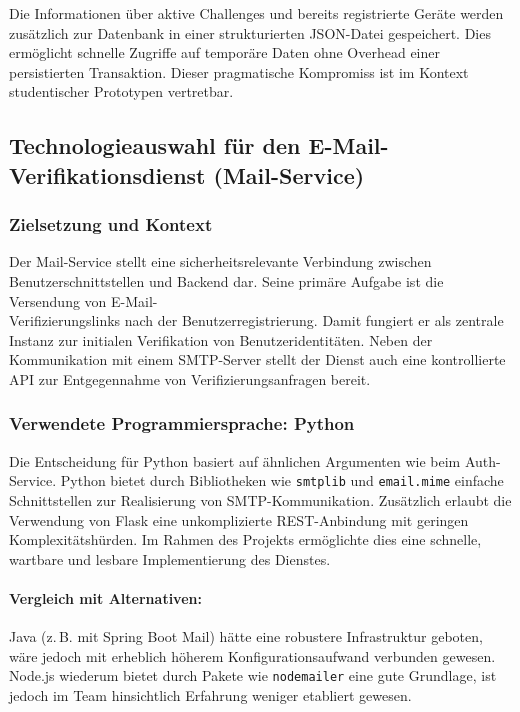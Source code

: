 Die Informationen \"uber aktive Challenges und bereits registrierte Ger\"ate werden zus\"atzlich zur Datenbank in einer strukturierten JSON-Datei gespeichert. Dies erm\"oglicht schnelle Zugriffe auf tempor\"are Daten ohne Overhead einer persistierten Transaktion. Dieser pragmatische Kompromiss ist im Kontext studentischer Prototypen vertretbar.

\subsection{Technologieauswahl f\"ur den E-Mail-Verifikationsdienst (Mail-Service)}

\subsubsection*{Zielsetzung und Kontext}

Der Mail-Service stellt eine sicherheitsrelevante Verbindung zwischen Benutzerschnittstellen und Backend dar. Seine prim\"are Aufgabe ist die Versendung von E-Mail-\\Verifizierungslinks nach der Benutzerregistrierung. Damit fungiert er als zentrale Instanz zur initialen Verifikation von Benutzeridentit\"aten. Neben der Kommunikation mit einem SMTP-Server stellt der Dienst auch eine kontrollierte API zur Entgegennahme von Verifizierungsanfragen bereit.

\subsubsection*{Verwendete Programmiersprache: Python}

Die Entscheidung f\"ur Python basiert auf \"ahnlichen Argumenten wie beim Auth-Service. Python bietet durch Bibliotheken wie \texttt{smtplib} und \texttt{email.mime} einfache Schnittstellen zur Realisierung von SMTP-Kommunikation. Zus\"atzlich erlaubt die Verwendung von Flask eine unkomplizierte REST-Anbindung mit geringen Komplexit\"atsh\"urden. Im Rahmen des Projekts erm\"oglichte dies eine schnelle, wartbare und lesbare Implementierung des Dienstes.

\paragraph*{Vergleich mit Alternativen:}

Java (z.\,B. mit Spring Boot Mail) h\"atte eine robustere Infrastruktur geboten, w\"are jedoch mit erheblich h\"oherem Konfigurationsaufwand verbunden gewesen. Node.js wiederum bietet durch Pakete wie \texttt{nodemailer} eine gute Grundlage, ist jedoch im Team hinsichtlich Erfahrung weniger etabliert gewesen.

